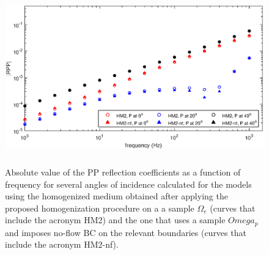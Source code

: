 \documentclass[draft]{agujournal2019}
\begin{document}
\begin{figure}[!ht]
\centering
        \includegraphics[width= 120mm, height=75mm]{rpp_2sandfracw.eps}
\caption{ Absolute value of the PP reflection coefficients as a function of frequency for several angles of incidence calculated for the models using the homogenized medium obtained after applying the proposed homogenization procedure on a a sample $\Omega_e $ (curves that include the acronym HM2) and the one that uses a sample $Omega_p$ and imposes no-flow BC on the relevant boundaries (curves that include the acronym HM2-nf).}
\label{fig.10}
\end{figure}
\end{document}
